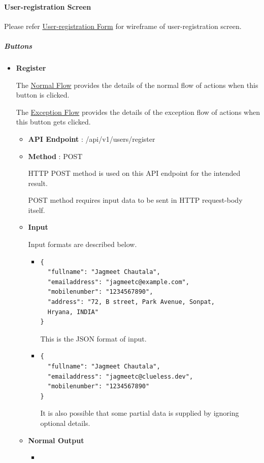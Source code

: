 \documentclass{article}%
\begin{document}
\paragraph{User{-}registration Screen}%

%
Please refer %
\hyperlink{ID:571525042}{User{-}registration Form}%
\xspace%
 for wireframe of user{-}registration screen.%
\hypertarget{ID:1584182760}{}%
\subparagraph{Buttons}%

%
\par%
\begin{itemize}%
\item%
\hypertarget{ID:1511731551}{}%
\textbf{Register}%
%
\par%
The %
\hyperlink{ID:1542674567}{Normal Flow}%
\xspace%
 provides the details of the normal flow of actions when this button is clicked.%
\par%
The %
\hyperlink{ID:69944687}{Exception Flow}%
\xspace%
 provides the details of the exception flow of actions when this button gets clicked.%
\begin{itemize}%
\item%
\hypertarget{ID:843038164}{}%
\textbf{API Endpoint}%
: %
/api/v1/users/register%
\par%
\item%
\hypertarget{ID:1268680316}{}%
\textbf{Method}%
: %
POST%
\par%
HTTP POST method is used on this API endpoint for the intended result.%
\par%
POST method requires input data to be sent in HTTP request{-}body itself.%
\item%
\hypertarget{ID:399010225}{}%
\textbf{Input}%
%
\par%
Input formats are described below.%
\begin{itemize}%
\item%
\hypertarget{ID:463301939}{}%

\begin{verbatim}
{
  "fullname": "Jagmeet Chautala",
  "emailaddress": "jagmeetc@example.com",
  "mobilenumber": "1234567890",
  "address": "72, B street, Park Avenue, Sonpat,
  Hryana, INDIA"
}
\end{verbatim}%
This is the JSON format of input.%
%
\item%
\hypertarget{ID:307633826}{}%

\begin{verbatim}
{
  "fullname": "Jagmeet Chautala",
  "emailaddress": "jagmeetc@clueless.dev",
  "mobilenumber": "1234567890"
}
\end{verbatim}%
It is also possible that some partial data is supplied by ignoring optional details.%
%
\end{itemize}%
\item%
\hypertarget{ID:362544910}{}%
\textbf{Normal Output}%
%
\par%
\begin{itemize}%
\item%
\hypertarget{ID:21800491}{}%


\end{itemize}
\end{itemize}
\end{itemize}
\end{document}
